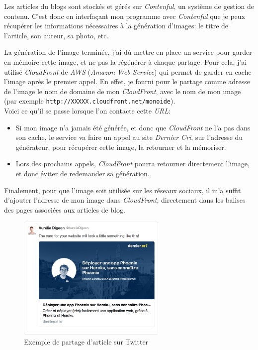 \documentclass[12pt,a4paper]{article}
\begin{document}
  Les articles du blogs sont stockés et gérés sur \emph{Contenful}, un
  système de gestion de contenu. C'est donc en interfaçant mon programme
  avec \emph{Contenful} que je peux récupérer les informations nécessaires
  à la génération d'images: le titre de l'article, son auteur, sa photo,
  etc.

  \bigskip

  La génération de l'image terminée, j'ai dû mettre en place un service
  pour garder en mémoire cette image, et ne pas la régénérer à chaque
  partage. Pour cela, j'ai utilisé \emph{CloudFront} de \emph{AWS}
  (\emph{Amazon Web Service}) qui permet de garder en cache l'image après
  le premier appel. En effet, je fourni pour le partage comme adresse de
  l'image le nom de domaine de mon \emph{CloudFront}, avec le nom de mon
  image (par exemple \texttt{http://XXXXX.cloudfront.net/monoide}).\\
  Voici ce qu'il se passe lorsque l'on contacte cette \emph{URL}:

  \begin{itemize}
  \item
    Si mon image n'a jamais été générée, et donc que \emph{CloudFront} ne
    l'a pas dans son cache, le service va faire un appel au site
    \emph{Dernier Cri}, sur l'adresse du générateur, pour récupérer cette
    image, la retourner et la mémoriser.
  \item
    Lors des prochains appels, \emph{CloudFront} pourra retourner
    directement l'image, et donc éviter de redemander sa génération.
  \end{itemize}

  \bigskip

  Finalement, pour que l'image soit utilisée sur les réseaux sociaux, il
  m'a suffit d'ajouter l'adresse de mon image dans \emph{CloudFront},
  directement dans les balises des pages associées aux articles de blog.

  \begin{figure}[h]
    \centering
    \includegraphics[height=6cm]{figures/partage-blog.png}
    \caption{Exemple de partage d'article sur Twitter}
  \end{figure}
\end{document}
